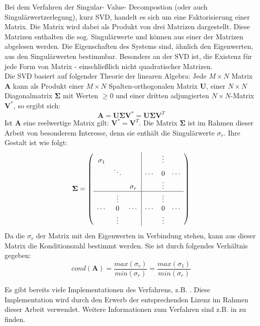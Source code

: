 Bei dem Verfahren der Singular- Value- Decompostion (oder auch Singulärwertzerlegung), kurz SVD, handelt es sich um eine Faktorisierung einer Matrix. Die Matrix wird dabei als Produkt von drei Matrizen dargestellt. Diese Matrizen enthalten die sog. Singulärwerte und können aus einer der Matrizen abgelesen werden. Die Eigenschaften des Systems sind, ähnlich den Eigenwerten, aus den Singulärwerten bestimmbar. Besonders an der SVD ist, die Existenz für jede Form von Matrix - einschließlich nicht quadratischer Matrizen.\\
Die SVD basiert auf folgender Theorie der linearen Algebra: Jede $M \times N$ Matrix $\mathbf{A}$ kann als Produkt einer $M \times N$ Spalten-orthogonalen Matrix $\mathbf{U}$, einer $N \times N$ Diagonalmatrix $\mathbf{\Sigma}$ mit Werten $\geq 0$ und einer dritten adjungierten $N \times N$-Matrix $\mathbf{V^*}$, so ergibt sich:
%
\begin{equation}
\mathbf{A}= \mathbf{U \Sigma V^*} = \mathbf{U \Sigma V}^T
\end{equation}
Ist $\mathbf{A}$ eine reelwertige Matrix gilt: $ \mathbf{V^*} = \mathbf{V}^T $. Die Matrix $\mathbf{ \Sigma }$ ist im Rahmen dieser Arbeit von besonderem Interesse, denn sie enthält die Singulärwerte $\sigma_r$. Ihre Gestalt ist wie folgt:
%
\begin{equation}
	\mathbf{\Sigma} = \left(\begin{array}{ccc|ccc}
	\sigma_1 &          &          &        & \vdots &        \\
	         & \ddots   &          & \cdots & 0      & \cdots \\
	         &          & \sigma_r &        & \vdots &        \\
	\hline
	         &  \vdots  &          &        & \vdots &        \\
	\cdots   &  0       & \cdots   & \cdots & 0      & \cdots \\
	         &  \vdots  &          &        & \vdots &        \\
	
	\end{array}\right)\nonumber
\end{equation}
%
%
Da die $\sigma_r$ der Matrix mit den Eigenwerten in Verbindung stehen, kann aus dieser Matrix die Konditionszahl bestimmt werden. Sie ist durch folgendes Verhältnis gegeben: 
\begin{equation}
	\label{eq:cond_from_svd}
	cond(\mathbf{A})=\frac{max(\sigma_r)}{min(\sigma_r)}=\frac{max(\sigma_1)}{min(\sigma_r)}
\end{equation} 

Es gibt bereits viele Implementationen des Verfahrens, z.B. \cite{press2007numerical}. Diese Implementation wird durch den Erwerb der entsprechenden Lizenz im Rahmen dieser Arbeit verwendet. Weitere Informationen zum Verfahren sind z.B. in \cite[Kaptiel 4.6.3]{bronstejn2012taschenbuch} zu finden.